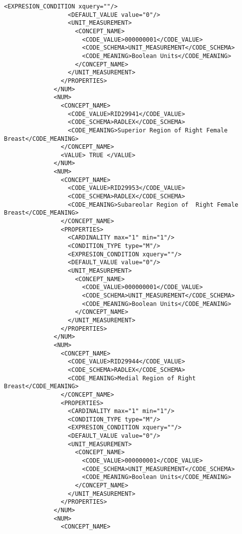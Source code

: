 \begin{lstlisting}[label=dicom-template,caption=Plantilla de un informe estructurado de una exploración de mama]
                  <EXPRESION_CONDITION xquery=""/>
                  <DEFAULT_VALUE value="0"/>
                  <UNIT_MEASUREMENT>
                    <CONCEPT_NAME>
                      <CODE_VALUE>000000001</CODE_VALUE>
                      <CODE_SCHEMA>UNIT_MEASUREMENT</CODE_SCHEMA>
                      <CODE_MEANING>Boolean Units</CODE_MEANING>
                    </CONCEPT_NAME>
                  </UNIT_MEASUREMENT>
                </PROPERTIES>
              </NUM>
              <NUM>
                <CONCEPT_NAME>
                  <CODE_VALUE>RID29941</CODE_VALUE>
                  <CODE_SCHEMA>RADLEX</CODE_SCHEMA>
                  <CODE_MEANING>Superior Region of Right Female Breast</CODE_MEANING>
                </CONCEPT_NAME>
                <VALUE> TRUE </VALUE>
              </NUM>
              <NUM>
                <CONCEPT_NAME>
                  <CODE_VALUE>RID29953</CODE_VALUE>
                  <CODE_SCHEMA>RADLEX</CODE_SCHEMA>
                  <CODE_MEANING>Subareolar Region of  Right Female Breast</CODE_MEANING>
                </CONCEPT_NAME>
                <PROPERTIES>
                  <CARDINALITY max="1" min="1"/>
                  <CONDITION_TYPE type="M"/>
                  <EXPRESION_CONDITION xquery=""/>
                  <DEFAULT_VALUE value="0"/>
                  <UNIT_MEASUREMENT>
                    <CONCEPT_NAME>
                      <CODE_VALUE>000000001</CODE_VALUE>
                      <CODE_SCHEMA>UNIT_MEASUREMENT</CODE_SCHEMA>
                      <CODE_MEANING>Boolean Units</CODE_MEANING>
                    </CONCEPT_NAME>
                  </UNIT_MEASUREMENT>
                </PROPERTIES>
              </NUM>
              <NUM>
                <CONCEPT_NAME>
                  <CODE_VALUE>RID29944</CODE_VALUE>
                  <CODE_SCHEMA>RADLEX</CODE_SCHEMA>
                  <CODE_MEANING>Medial Region of Right Breast</CODE_MEANING>
                </CONCEPT_NAME>
                <PROPERTIES>
                  <CARDINALITY max="1" min="1"/>
                  <CONDITION_TYPE type="M"/>
                  <EXPRESION_CONDITION xquery=""/>
                  <DEFAULT_VALUE value="0"/>
                  <UNIT_MEASUREMENT>
                    <CONCEPT_NAME>
                      <CODE_VALUE>000000001</CODE_VALUE>
                      <CODE_SCHEMA>UNIT_MEASUREMENT</CODE_SCHEMA>
                      <CODE_MEANING>Boolean Units</CODE_MEANING>
                    </CONCEPT_NAME>
                  </UNIT_MEASUREMENT>
                </PROPERTIES>
              </NUM>
              <NUM>	
                <CONCEPT_NAME>

\end{lstlisting}
